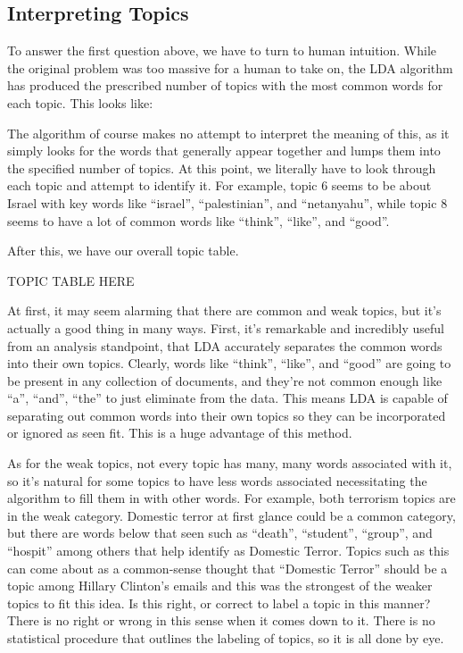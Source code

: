 \documentclass[12pt]{article}
\theoremstyle{definition}
\theoremstyle{algodesc}
\begin{document}
\subsection{Interpreting Topics}

To answer the first question above, we have to turn to human intuition.  While the original problem was too massive for a human to take on, the LDA algorithm has produced the prescribed number of topics with the most common words for each topic.  This looks like:

The algorithm of course makes no attempt to interpret the meaning of this, as it simply looks for the words that generally appear together and lumps them into the specified number of topics.  At this point, we literally have to look through each topic and attempt to identify it.  For example, topic 6 seems to be about Israel with key words like ``israel'', ``palestinian'', and ``netanyahu'', while topic 8 seems to have a lot of common words like ``think'', ``like'', and ``good''.

After this, we have our overall topic table.

TOPIC TABLE HERE

At first, it may seem alarming that there are common and weak topics, but it's actually a good thing in many ways.  First, it's remarkable and incredibly useful from an analysis standpoint, that LDA accurately separates the common words into their own topics.  Clearly, words like ``think'', ``like'', and ``good'' are going to be present in any collection of documents, and they're not common enough like ``a'', ``and'', ``the'' to just eliminate from the data.  This means LDA is capable of separating out common words into their own topics so they can be incorporated or ignored as seen fit.  This is a huge advantage of this method.

As for the weak topics, not every topic has many, many words associated with it, so it's natural for some topics to have less words associated necessitating the algorithm to fill them in with other words.  For example, both terrorism topics are in the weak category.   Domestic terror at first glance could be a common category, but there are words below that seen such as ``death'', ``student'', ``group'', and ``hospit'' among others that help identify as Domestic Terror.  Topics such as this can come about as a common-sense thought that ``Domestic Terror'' should be a topic among Hillary Clinton's emails and this was the strongest of the weaker topics to fit this idea.  Is this right, or correct to label a topic in this manner?  There is no right or wrong in this sense when it comes down to it.  There is no statistical procedure that outlines the labeling of topics, so it is all done by eye.  
\end{document}
